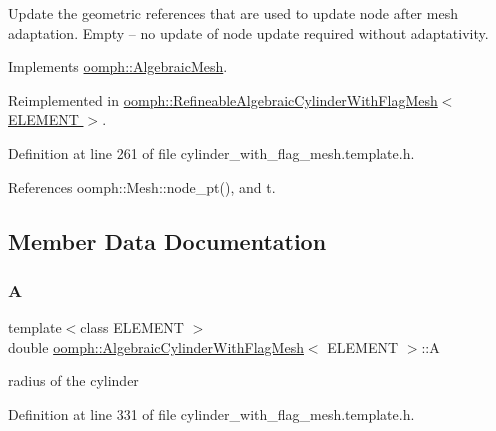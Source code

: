 Update the geometric references that are used to update node after mesh adaptation. Empty -- no update of node update required without adaptativity. 



Implements \hyperlink{classoomph_1_1AlgebraicMesh_a6c6a35ae2be6e2766f5b80d85693c1ce}{oomph\+::\+Algebraic\+Mesh}.



Reimplemented in \hyperlink{classoomph_1_1RefineableAlgebraicCylinderWithFlagMesh_a186963cf4b1fc118929e49e012eba4d2}{oomph\+::\+Refineable\+Algebraic\+Cylinder\+With\+Flag\+Mesh$<$ E\+L\+E\+M\+E\+N\+T $>$}.



Definition at line 261 of file cylinder\+\_\+with\+\_\+flag\+\_\+mesh.\+template.\+h.



References oomph\+::\+Mesh\+::node\+\_\+pt(), and t.



\subsection{Member Data Documentation}
\mbox{\label{classoomph_1_1AlgebraicCylinderWithFlagMesh_aabc6cdfe508f04a4b1c92f2c2f1639c4}} 
\subsubsection{\texorpdfstring{A}{A}}
{\footnotesize\ttfamily template$<$class E\+L\+E\+M\+E\+NT $>$ \\
double \hyperlink{classoomph_1_1AlgebraicCylinderWithFlagMesh}{oomph\+::\+Algebraic\+Cylinder\+With\+Flag\+Mesh}$<$ E\+L\+E\+M\+E\+NT $>$\+::A\hspace{0.3cm}{\ttfamily [protected]}}



radius of the cylinder 



Definition at line 331 of file cylinder\+\_\+with\+\_\+flag\+\_\+mesh.\+template.\+h.

\mbox{\label{classoomph_1_1AlgebraicCylinderWithFlagMesh_ac1f7e1ba183ba813229302c5688ea1ba}} 
